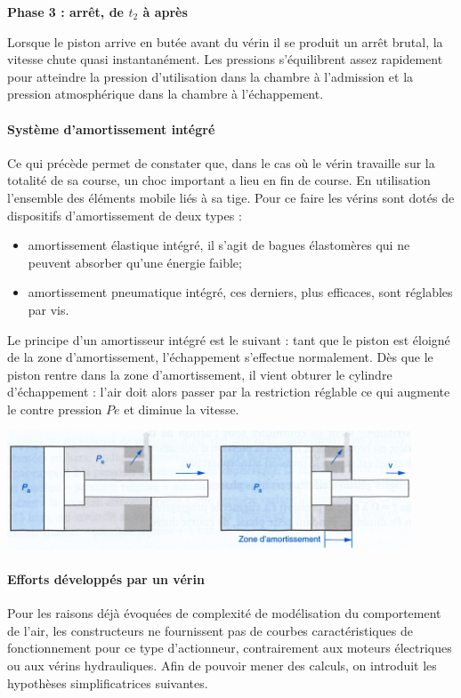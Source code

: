 \documentclass[10pt]{article}
\begin{document}
\textbf{Phase 3 : arrêt, de $t_2$ à après }

Lorsque le piston arrive en butée avant du vérin il se produit un arrêt brutal, la vitesse chute quasi instantanément. Les pressions s'équilibrent assez rapidement pour atteindre la pression d'utilisation dans la chambre à l'admission et la pression atmosphérique dans la chambre à l'échappement. 

\paragraph{Système d'amortissement intégré}
Ce qui précède permet de constater que, dans le cas où le vérin travaille sur la totalité de sa course, un choc important a lieu en fin de course. En utilisation l'ensemble des éléments mobile liés à sa tige. Pour ce faire les vérins sont dotés de dispositifs d'amortissement de deux types : 
\begin{itemize}
\item amortissement élastique intégré, il s'agit de bagues élastomères qui ne peuvent absorber qu'une énergie faible;
\item amortissement pneumatique intégré, ces derniers, plus efficaces, sont réglables par vis. 
\end{itemize}

Le principe d'un amortisseur intégré est le suivant : tant que le piston est éloigné de la zone d'amortissement, l'échappement s'effectue normalement. Dès que le piston rentre dans la zone d'amortissement, il vient obturer le cylindre d'échappement : l'air doit alors passer par la restriction réglable ce qui augmente le contre pression $Pe$ et diminue la vitesse. 


\begin{center}
\includegraphics[width=12cm]{images/fig3}
\end{center}

\paragraph{Efforts développés par un vérin}
Pour les raisons déjà évoquées de complexité de modélisation du comportement de l'air, les constructeurs ne fournissent pas de courbes caractéristiques de fonctionnement pour ce type d'actionneur, contrairement aux moteurs électriques ou aux vérins hydrauliques. Afin de pouvoir mener des calculs, on introduit les hypothèses simplificatrices suivantes. 
\end{document}
